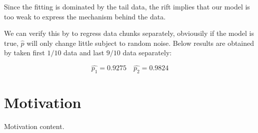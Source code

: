 \documentclass{article}
\begin{document}
Since the fitting is dominated by the tail data, the rift implies that our model is too weak to express 
the mechanism behind the data.

We can verify this by to regress data chunks separately, 
obviousily if the model is true, $\hat{p}$ will only change little subject to random noise. 
Below results are obtained by taken first $1/10$ data and last $9/10$ data separately:

\[
\hat{p_1} = 0.9275 \quad \hat{p_2} = 0.9824
\]






\section{Motivation}

Motivation content.
\end{document}
